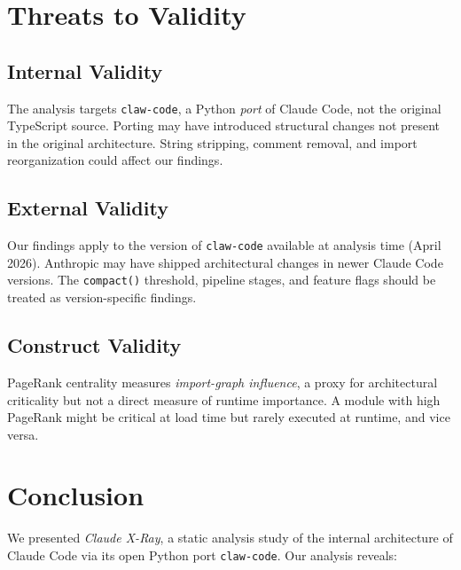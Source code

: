 \documentclass[conference]{IEEEtran}
\begin{document}
\section{Threats to Validity}

\subsection{Internal Validity}

The analysis targets \texttt{claw-code}, a Python \emph{port} of
Claude Code, not the original TypeScript source. Porting may have
introduced structural changes not present in the original
architecture. String stripping, comment removal, and import
reorganization could affect our findings.

\subsection{External Validity}

Our findings apply to the version of \texttt{claw-code} available
at analysis time (April 2026). Anthropic may have shipped
architectural changes in newer Claude Code versions. The
\texttt{compact()} threshold, pipeline stages, and feature flags
should be treated as version-specific findings.

\subsection{Construct Validity}

PageRank centrality measures \emph{import-graph influence}, a proxy
for architectural criticality but not a direct measure of runtime
importance. A module with high PageRank might be critical at load
time but rarely executed at runtime, and vice versa.

\section{Conclusion}

We presented \emph{Claude X-Ray}, a static analysis study of the
internal architecture of Claude Code via its open Python port
\texttt{claw-code}. Our analysis reveals:
\end{document}
